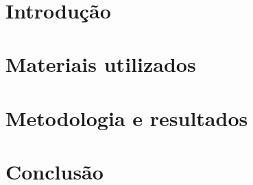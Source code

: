 \documentclass[12pt, oneside, a4paper, english, brazil]{abntex2}
\renewcommand{\imprimircapa}{%
    \begin{capa}%
        \center
        \ABNTEXchapterfont\large\textsc{\imprimirinstituicao}
        \vspace*{1.1cm}
        \par
        {\ABNTEXchapterfont\large\imprimirautor}
        \vfill
        \begin{center}
            {\ABNTEXchapterfont\Large\textsc{\imprimirtitulo}}
        \end{center}
        \vfill
        \large\imprimirlocal\
        \par
        \large\imprimirdata
        \vspace*{1cm}
    \end{capa}
}
\renewcommand{\imprimirfolhaderosto}{
    \begin{center}%
        {\ABNTEXchapterfont\large\imprimirautor}

        \vspace*{\fill}\vspace*{\fill}
        \begin{center}
            {\ABNTEXchapterfont\Large\textsc{\imprimirtitulo}}
        \end{center}
        \vspace*{\fill}

        \hspace{.45\textwidth}
        \begin{minipage}{.5\textwidth}
            \SingleSpacing
            \imprimirpreambulo
        \end{minipage}%
        \vspace*{\fill}

        \large\imprimirlocal
        \par
        \large\imprimirdata
        \vspace*{1cm}
    \end{center}
    \newpage
}
\begin{document}
    \frenchspacing             %



    \imprimircapa
    \imprimirfolhaderosto




    \tableofcontents*
    \cleardoublepage

    \textual


    \chapter*[Introdução]{Introdução}
        

    \chapter{Materiais utilizados}
        

    \chapter{Metodologia e resultados}
        
    
    
    \chapter*[Conclusão]{Conclusão}
        
\end{document}
